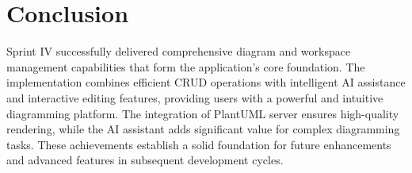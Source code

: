 \section{Conclusion}

Sprint IV successfully delivered comprehensive diagram and workspace management capabilities that form the application's core foundation. The implementation combines efficient CRUD operations with intelligent AI assistance and interactive editing features, providing users with a powerful and intuitive diagramming platform. The integration of PlantUML server ensures high-quality rendering, while the AI assistant adds significant value for complex diagramming tasks. These achievements establish a solid foundation for future enhancements and advanced features in subsequent development cycles.